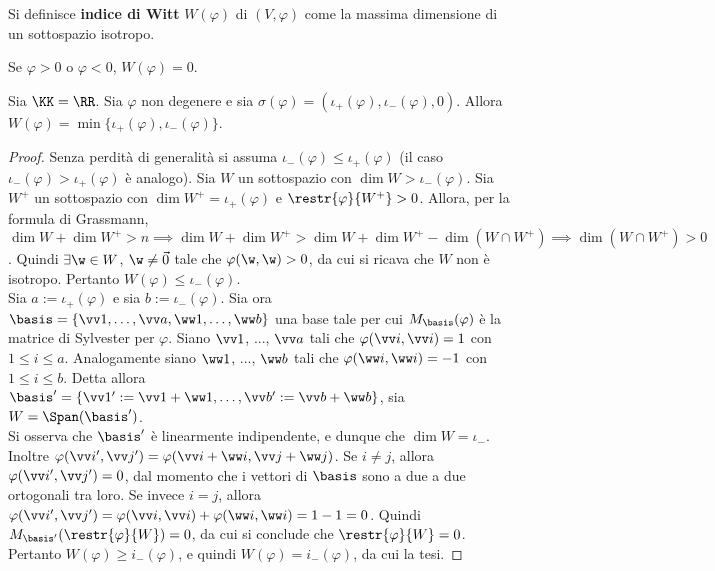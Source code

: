 \begin{definition}
	Si definisce \textbf{indice di Witt} $W(\varphi)$ di $(V, \varphi)$
	come la massima dimensione di un sottospazio isotropo. 
\end{definition}

\begin{remark}\nl
	\li Se $\varphi > 0$ o $\varphi < 0$, $W(\varphi) = 0$.
\end{remark}

\begin{proposition}
	Sia $\KK = \RR$. Sia $\varphi$ non degenere e sia $\sigma(\varphi) = (\iota_+(\varphi), \iota_-(\varphi), 0)$. Allora
	$W(\varphi) = \min\{\iota_+(\varphi), \iota_-(\varphi)\}$.
\end{proposition}

\begin{proof}
	Senza perdità di generalità si assuma $\iota_-(\varphi) \leq \iota_+(\varphi)$ (il caso $\iota_-(\varphi) > \iota_+(\varphi)$ è analogo). Sia $W$ un sottospazio con $\dim W > \iota_-(\varphi)$. Sia $W^+$
	un sottospazio con $\dim W^+ = \iota_+(\varphi)$ e $\restr{\varphi}{W^+} > 0$. Allora, per la formula
	di Grassmann, $\dim W + \dim W^+ > n \implies \dim W + \dim W^+ > \dim W + \dim W^+ - \dim (W \cap W^+) \implies \dim (W \cap W^+) > 0$. Quindi $\exists \w \in W$, $\w \neq \vec 0$ tale che $\varphi(\w, \w) > 0$, da cui
	si ricava che $W$ non è isotropo. Pertanto $W(\varphi) \leq \iota_-(\varphi)$. \\
	
	Sia $a := \iota_+(\varphi)$ e sia $b := \iota_-(\varphi)$.
	Sia ora $\basis = \{ \vv 1, \ldots, \vv a, \ww 1, \ldots, \ww b \}$ una base tale per cui $M_\basis(\varphi)$ è  la matrice di Sylvester per $\varphi$. Siano $\vv 1$, ..., $\vv a$ tali che $\varphi(\vv i, \vv i) = 1$
	con $1 \leq i \leq a$. Analogamente siano $\ww 1$, ..., $\ww b$ tali che $\varphi(\ww i, \ww i) = -1$ con
	$1 \leq i \leq b$. Detta allora $\basis' = \{ \vv 1 ' := \vv 1 + \ww 1, \ldots, \vv b ' := \vv b + \ww b \}$, sia $W = \Span(\basis')$. \\
	
	Si osserva che $\basis'$ è linearmente indipendente, e dunque che $\dim W = \iota_-$. Inoltre
	$\varphi(\vv i ', \vv j ') = \varphi(\vv i + \ww i, \vv j + \ww j)$. Se $i \neq j$, allora
	$\varphi(\vv i ', \vv j ') = 0$, dal momento che i vettori di $\basis$ sono a due a due ortogonali
	tra loro. Se invece $i = j$, allora $\varphi(\vv i ', \vv j ') = \varphi(\vv i, \vv i) + \varphi(\ww i, \ww i) = 1-1=0$. Quindi $M_{\basis'}(\restr{\varphi}{W}) = 0$, da cui si conclude che $\restr{\varphi}{W} = 0$.
	Pertanto $W(\varphi) \geq i_-(\varphi)$, e quindi $W(\varphi) = i_-(\varphi)$, da cui la tesi.
\end{proof}